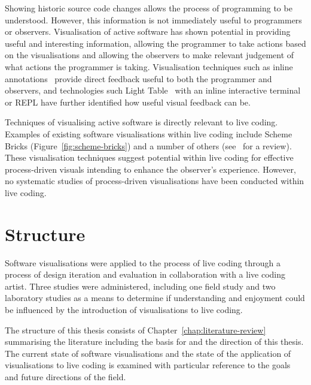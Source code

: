   

Showing historic source code changes allows the process of programming to be understood. However, this information is not immediately useful to programmers or observers. Visualisation of active software has shown potential in providing useful and interesting information, allowing the programmer to take actions based on the visualisations and allowing the observers to make relevant judgement of what actions the programmer is taking. Visualisation techniques such as inline annotations~\cite{Swift2013,Beck2013} provide direct feedback useful to both the programmer and observers, and technologies such Light Table~\cite{Kodowa2014} with an inline interactive terminal or \ac{REPL} have further identified how useful visual feedback can be.

Techniques of visualising active software is directly relevant to live coding. Examples of existing software visualisations within live coding include Scheme Bricks (Figure~\ref{fig:scheme-bricks}) and a number of others (see~\cite{McLean2010a} for a review). These visualisation techniques suggest potential within live coding for effective process-driven visuals intending to enhance the observer's experience. However, no systematic studies of process-driven visualisations have been conducted within live coding.


\section{Structure}

Software visualisations were applied to the process of live coding through a process of design iteration and evaluation in collaboration with a live coding artist. Three studies were administered, including one field study and two laboratory studies as a means to determine if understanding and enjoyment could be influenced by the introduction of visualisations to live coding.

The structure of this thesis consists of Chapter~\ref{chap:literature-review} summarising the literature including the basis for and the direction of this thesis. The current state of software visualisations and the state of the application of visualisations to live coding is examined with particular reference to the goals and future directions of the field.

